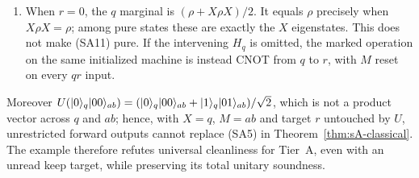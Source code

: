 \begin{theorem}
\begin{enumerate}
\[ \]
 The channel in the second line is unitary on $q$ if and only if
 $\tau=P_+$ or $\tau=P_-$. The map from $q$ to retained $qr$ in
 the first line is isometric if and only if the same condition holds;
 the word unitary here applies only after identifying the fixed $r$
 factor with a one-dimensional space. For $\tau=P_+$ the action is
 identity on $q$ and $M$ resets. For $\tau=P_-$ the action is $X$
 on $q$ and $M$ is the fixed state $\ket{10}$, so it does not reset.
 \item When $r=0$, the $q$ marginal is $(\rho+X\rho X)/2$.
 It equals $\rho$ precisely when $X\rho X=\rho$; among pure states
 these are exactly the $X$ eigenstates. This does not make (SA11)
 pure. If the intervening $H_q$ is omitted, the marked operation on
 the same initialized machine is instead CNOT from $q$ to $r$,
 with $M$ reset on every $qr$ input.
\end{enumerate}
Moreover
$U(\lvert 0\rangle_q\lvert 00\rangle_{ab})
=(\lvert 0\rangle_q\lvert 00\rangle_{ab}+\lvert 1\rangle_q\lvert 01\rangle_{ab})/\sqrt2$, which is not a
product vector across $q$ and $ab$; hence, with $X=q$, $M=ab$ and target
$r$ untouched by $U$, unrestricted forward outputs cannot replace (SA5)
in Theorem~\ref{thm:sA-classical}.
The example therefore refutes universal cleanliness for Tier~A, even
with an unread keep target, while preserving its total unitary soundness.
\end{theorem}
